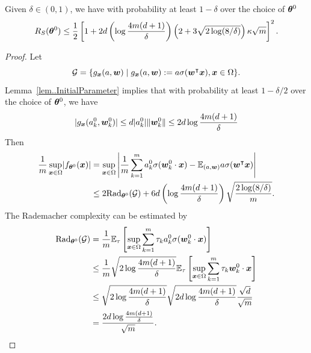 \documentclass{article}
\begin{document}
\begin{lem}
    Given $\delta\in(0,1)$, we have with probability at least $1-\delta$ over the choice of $\bm{\theta}^0$
    \begin{equation}
        R_S(\bm{\theta}^0)\leq\frac{1}{2}\left[1 + 2d\left(\log\frac{4m(d+1)}{\delta}\right)\left(2+3\sqrt{2\log(8/\delta)}\right)\kappa\sqrt{m}\right]^2.
    \end{equation}
\end{lem}
\begin{proof}
    Let
    \begin{equation}
        \mathcal{G} = \{g_{\bm{x}}(a,\bm{w}) \mid g_{\bm{x}}(a,\bm{w}):=a\sigma(\bm{w}^\intercal\bm{x}),\bm{x}\in\Omega \}.
    \end{equation}
    Lemma~\ref{lem..InitialParameter} implies that with probability at least $1-\delta/2$ over the choice of $\bm{\theta}^0$, we have
    \begin{equation}
        \lvert g_{\bm{x}}(a^0_k,\bm{w}^0_k)\rvert\leq d\lvert a_k^0\rvert\lVert\bm{w}^0_k\rVert\leq 2d\log\frac{4m(d+1)}{\delta}
    \end{equation}
    Then
    \begin{equation}
        \begin{aligned}
            \frac{1}{ m}\sup_{\bm{x}\in\Omega}\lvert f_{\bm{\theta}^0}(\bm{x})\rvert
             & =\sup_{\bm{x}\in\Omega}\left\lvert \frac{1}{m}\sum_{k=1}^m a_k^0\sigma(\bm{w}_k^0\cdot\bm{x})-\mathbb{E}_{(a,\bm{w})}a\sigma(\bm{w}^\intercal\bm{x})\right\rvert \\
             & \leq 2\mathrm{Rad}_{\bm{\theta}^0}(\mathcal{G}) + 6d \left(\log\frac{4m(d+1)}{\delta}\right)\sqrt{\frac{2\log(8/\delta)}{m}}.
        \end{aligned}
    \end{equation}
    The Rademacher complexity can be estimated by
    \begin{equation}
        \begin{aligned}
            \Rad_{\vtheta^0}(\fG)
             & =\frac{1}{m}\Exp_{\tau}\left[\sup_{\vx\in\Omega}\sum_{k=1}^m\tau_ka^0_k\sigma(\vw^0_k\cdot\vx)\right]   \\
             & \leq\frac{1}{m}\sqrt{2\log\frac{4m(d+1)}{\delta}}\Exp_{\tau}\left[\sup_{\vx\in\Omega}\sum_{k=1}^m\tau_k
            \vw_k^0\cdot\vx\right]                                                                                     \\
             & \leq\sqrt{2\log\frac{4m(d+1)}{\delta}}\sqrt{2d\log\frac{4m(d+1)}{\delta}}\frac{\sqrt{d}}{\sqrt{m}}      \\
             & =\frac{2d\log\frac{4m(d+1)}{\delta}}{\sqrt{m}}.

\end{aligned}
\end{equation}
\end{proof}
\end{document}
